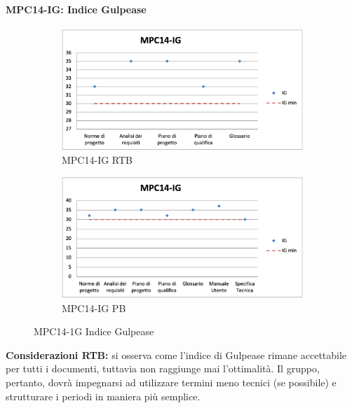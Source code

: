 \paragraph{MPC14-IG: Indice Gulpease}
\begin{figure}[h!]
    \centering
    \begin{subfigure}[b]{0.45\textwidth}
        \centering
        \includegraphics[width=\textwidth]{images/MPC14-EODrtb.png}
        \caption{MPC14-IG RTB}
        \label{fig:image1}
    \end{subfigure}
    \hfill
    \begin{subfigure}[b]{0.45\textwidth}
        \centering
        \includegraphics[width=\textwidth]{images/MPC14-IG.png}
        \caption{MPC14-IG PB}
        \label{fig:image2}
    \end{subfigure}
    \caption{MPC14-1G Indice Gulpease}
    \label{fig:whole_figure}
\end{figure}

\noindent \textbf{Considerazioni RTB:} si osserva come l'indice di Gulpease rimane accettabile per tutti i documenti, tuttavia non raggiunge mai l'ottimalità. Il gruppo, pertanto, dovrà impegnarsi ad utilizzare termini meno tecnici (se possibile) e strutturare i periodi in maniera più semplice.

